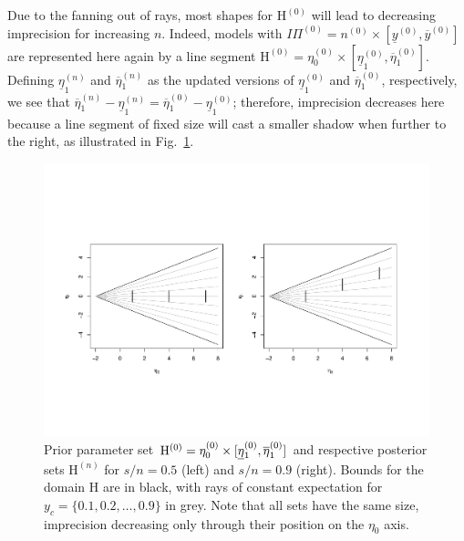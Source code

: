 \documentclass[runningheads,a4paper]{llncs}
\newcommand{\uz}{^{(0)}} %
\newcommand{\un}{^{(n)}} %
\newcommand{\ul}[1]{\underline{#1}}
\newcommand{\ol}[1]{\overline{#1}}
\def\yzl{\ul{y}\uz}
\def\yzu{\ol{y}\uz}
\def\nz{n\uz}
\def\PZ{I\!\!\Pi\uz}
\def\Eta{\mathrm{H}}
\def\EZ{\mathrm{H}\uz}
\def\EN{\mathrm{H}\un}
\def\ezz{\eta_0\uz}
\def\ezn{\eta_0\un}
\def\eozl{\ul{\eta}_1\uz}
\def\eozu{\ol{\eta}_1\uz}
\def\eonl{\ul{\eta}_1\un}
\def\eonu{\ol{\eta}_1\un}
\begin{document}
Due to the fanning out of rays, most shapes for $\EZ$ will lead to decreasing imprecision for increasing $n$.
Indeed, models with $\PZ = \nz \times [\yzl, \yzu]$
are represented here again by a line segment $\EZ = \ezz \times [\eozl,\eozu]$.
Defining $\eonl$ and $\eonu$ as the updated versions of $\eozl$ and $\eozu$, respectively,
we see that $\eonu-\eonl = \eozu-\eozl$;
therefore, imprecision decreases here because a line segment of fixed size
will cast a smaller shadow when further to the right,
as illustrated in Fig.~\ref{fig:boatshape-vertical}.
\begin{figure}  %
\centering
\includegraphics[trim = 16mm 48mm 25mm 62mm, clip, width=\textwidth]{R/boatshape-vertical}%
\caption[Line segment parameter set $\EZ$ %
and respective posterior sets for $s/n=0.5$ and $s/n=0.9$.]%
{Prior parameter set $\EZ = \ezz \times [\text{\underline{$\eta$}${}_1\uz$},\eozu]$
and respective posterior sets $\EN$ for $s/n=0.5$ (left) and $s/n=0.9$ (right).
Bounds for the domain $\Eta$ are in black, with rays of constant expectation for $y_c = \{0.1,0.2,\ldots,0.9\}$ in grey. 
Note that all sets have the same size, imprecision decreasing only through their position on the $\eta_0$ axis.}
\label{fig:boatshape-vertical}
\end{figure}
\end{document}
